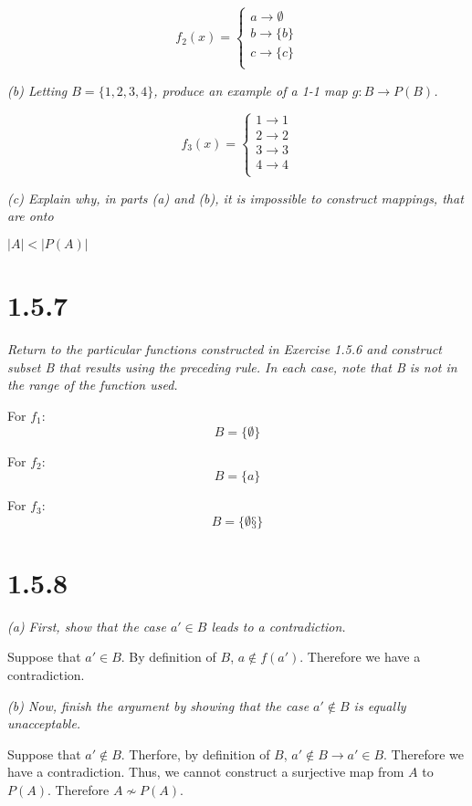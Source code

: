 \documentclass[11pt,oneside,titlepage]{article}
\begin{document}
\begin{equation}
  f_2(x) =
  \begin{cases}
    a \to \emptyset \\
    b \to \{b\} \\
    c \to \{c\} \\
  \end{cases}    
\end{equation}

\textit{(b) Letting $B = \{1, 2, 3, 4\}$, produce an example of a 1-1 map $g: B \to P(B)$.
}

\begin{equation}
  f_3(x) =
  \begin{cases}
    1 \to {1} \\
    2 \to {2} \\
    3 \to {3} \\
    4 \to {4} \\
  \end{cases}    
\end{equation}

\textit{(c) Explain why, in parts (a) and (b), it is impossible to construct mappings,
  that are onto}

$|A| < |P(A)|$

\section*{1.5.7}
\textit{Return to the particular functions constructed in Exercise 1.5.6 and construct
  subset B that results using the preceding rule. In each case, note that B is not in
  the range of the function used. }

For $f_1$:
$$B = \{\emptyset\}$$

For $f_2$:
$$B = \{a\}$$

For $f_3$:
$$B = \{\emptyset§\}$$

\section*{1.5.8}
\textit{(a) First, show that the case $a' \in B$ leads to a contradiction.}

Suppose that $a' \in B$. By definition of $B$,  $a \notin f(a')$. Therefore we have a
contradiction.

\textit{(b) Now, finish the argument by showing that the case $a' \notin B$ is
  equally unacceptable.}

Suppose that $a' \notin B$. Therfore, by definition of $B$, $a' \notin B \to a' \in B$.
Therefore we have a contradiction. Thus, we cannot construct a surjective map from $A$ to
$P(A)$. Therefore $A \not\sim P(A)$.
\end{document}
